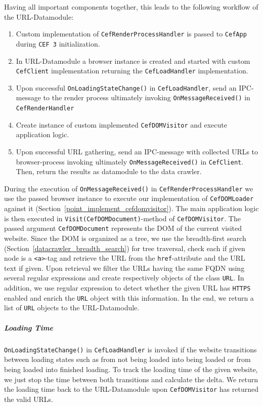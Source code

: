 Having all important components together, this leads to the following workflow of the URL-Datamodule:

\begin{enumerate}
	\item Custom implementation of \texttt{CefRenderProcessHandler} is passed to \texttt{CefApp} during \texttt{CEF 3} initialization.
	\item In URL-Datamodule a browser instance is created and started with custom \texttt{CefClient} implementation returning the \texttt{CefLoadHandler} implementation.
	\item Upon successful \texttt{OnLoadingStateChange()} in \texttt{CefLoadHandler}, send an IPC-message to the render process ultimately invoking \texttt{OnMessageReceived()} in \texttt{CefRenderHandler}
	\item Create instance of custom implemented \texttt{CefDOMVisitor} and execute application logic.
	\label{point_implement_cefdomvisitor}
	\item Upon successful URL gathering, send an IPC-message with collected URLs to browser-process invoking ultimately \texttt{OnMessageReceived()} in \texttt{CefClient}. Then, return the results as datamodule to the data crawler.
\end{enumerate}  

During the execution of \texttt{OnMessageReceived()} in \texttt{CefRenderProcessHandler} we use the passed browser instance to execute our implementation of \texttt{CefDOMLoader} against it (Section~\ref{point_implement_cefdomvisitor}). The main application logic is then executed in \texttt{Visit(CefDOMDocument)}-method of \texttt{CefDOMVisitor}. The passed argument \texttt{CefDOMDocument} represents the DOM of the current visited website. Since the DOM is organized as a tree, we use the breadth-first search (Section~\ref{datacrawler_breadth_search}) for tree traversal, check each if given node is a \texttt{<a>}-tag and retrieve the URL from the \texttt{href}-attribute and the URL text if given. Upon retrieval we filter the URLs having the same FQDN using several regular expressions and create respectively objects of the class \texttt{URL}. In addition, we use regular expression to detect whether the given URL has \texttt{HTTPS} enabled and enrich the \texttt{URL} object with this information. In the end, we return a list of \texttt{URL} objects to the URL-Datamodule.

\subparagraph*{Loading Time}
\texttt{OnLoadingStateChange()} in \texttt{CefLoadHandler} is invoked if the website transitions between loading states such as from not being loaded into being loaded or from being loaded into finished loading. To track the loading time of the given website, we just stop the time between both transitions and calculate the delta. We return the loading time back to the URL-Datamodule upon \texttt{CefDOMVisitor} has returned the valid URLs.

